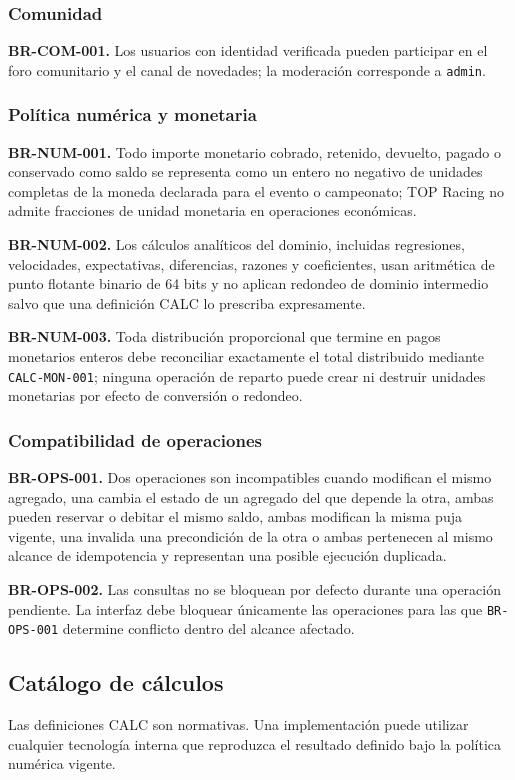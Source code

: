 \documentclass[10pt,letterpaper]{article}
\begin{document}
\subsubsection{Comunidad}
\noindent\textbf{BR-COM-001.} Los usuarios con identidad verificada pueden participar en el foro comunitario y el canal de novedades; la moderación corresponde a \texttt{admin}.\par
\subsubsection{Política numérica y monetaria}
\noindent\textbf{BR-NUM-001.} Todo importe monetario cobrado, retenido, devuelto, pagado o conservado como saldo se representa como un entero no negativo de unidades completas de la moneda declarada para el evento o campeonato; TOP Racing no admite fracciones de unidad monetaria en operaciones económicas.\par
\noindent\textbf{BR-NUM-002.} Los cálculos analíticos del dominio, incluidas regresiones, velocidades, expectativas, diferencias, razones y coeficientes, usan aritmética de punto flotante binario de 64 bits y no aplican redondeo de dominio intermedio salvo que una definición CALC lo prescriba expresamente.\par
\noindent\textbf{BR-NUM-003.} Toda distribución proporcional que termine en pagos monetarios enteros debe reconciliar exactamente el total distribuido mediante \texttt{CALC-MON-001}; ninguna operación de reparto puede crear ni destruir unidades monetarias por efecto de conversión o redondeo.\par
\subsubsection{Compatibilidad de operaciones}
\noindent\textbf{BR-OPS-001.} Dos operaciones son incompatibles cuando modifican el mismo agregado, una cambia el estado de un agregado del que depende la otra, ambas pueden reservar o debitar el mismo saldo, ambas modifican la misma puja vigente, una invalida una precondición de la otra o ambas pertenecen al mismo alcance de idempotencia y representan una posible ejecución duplicada.\par
\noindent\textbf{BR-OPS-002.} Las consultas no se bloquean por defecto durante una operación pendiente. La interfaz debe bloquear únicamente las operaciones para las que \texttt{BR-OPS-001} determine conflicto dentro del alcance afectado.\par
\subsection{Catálogo de cálculos}
Las definiciones CALC son normativas. Una implementación puede utilizar cualquier tecnología interna que reproduzca el resultado definido bajo la política numérica vigente.
\end{document}
